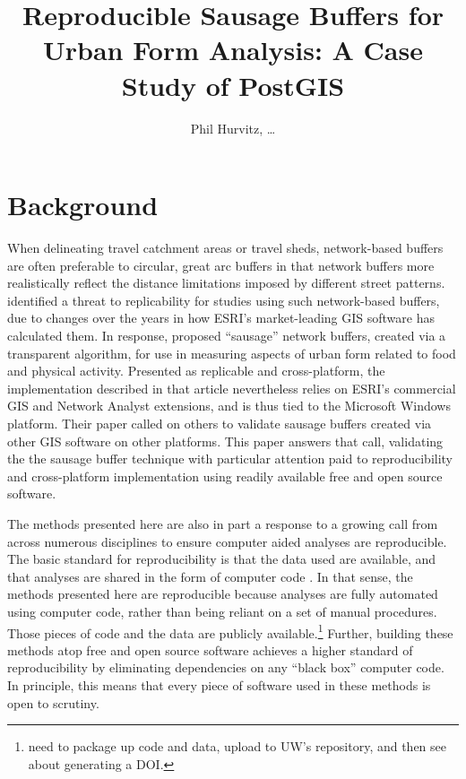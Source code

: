 \documentclass[11pt,letterpaper]{article} %
\title{Reproducible Sausage Buffers for Urban Form Analysis: A Case Study of PostGIS}
\author{Phil Hurvitz, \ldots}
\date{}
\begin{document}
\maketitle

\section*{Background}
When delineating travel catchment areas or travel sheds, network-based
buffers are often preferable to circular, great arc buffers in that
network buffers more realistically reflect the distance limitations
imposed by different street patterns. \textcite{Forsyth2014sausage}
identified a threat to replicability for studies using such
network-based buffers, due to changes over the years in how ESRI's
market-leading GIS software has calculated them. In response,
\citeauthor{Forsyth2014sausage} proposed ``sausage'' network buffers,
created via a transparent algorithm, for use in measuring aspects of
urban form related to food and physical activity. Presented as
replicable and cross-platform, the implementation described in that
article nevertheless relies on ESRI's commercial GIS and Network
Analyst extensions, and is thus tied to the Microsoft Windows
platform. Their paper called on others to validate sausage buffers
created via other GIS software on other platforms. This paper answers
that call, validating the the sausage buffer technique with particular
attention paid to reproducibility and cross-platform implementation
using readily available free and open source software.

The methods presented here are also in part a response to a growing
call from across numerous disciplines to ensure computer aided
analyses are reproducible. The basic standard for reproducibility is
that the data used are available, and that analyses are shared in the
form of computer code \cite{Peng2011computational}. In that sense, the
methods presented here are reproducible because analyses are fully
automated using computer code, rather than being reliant on a set of
manual procedures. Those pieces of code and the data are publicly
available.\footnote{need to package up code and data, upload to UW's
  repository, and then see about generating a DOI.}  Further, building
these methods atop free and open source software achieves a higher
standard of reproducibility by eliminating dependencies on any ``black
box'' computer code. In principle, this means that every piece of
software used in these methods is open to scrutiny.
\end{document}
